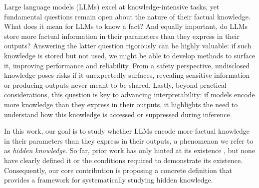 Large language models (LLMs) excel at knowledge-intensive tasks, yet fundamental questions remain open about the nature of their factual knowledge. 
What does it mean for LLMs to know a fact? And equally important, do LLMs store more factual information in their parameters than they express in their outputs? Answering the latter question rigorously can be highly valuable: if such knowledge is stored but not used, we might be able to develop methods to surface it, improving performance and reliability. From a safety perspective, undisclosed knowledge poses risks if it unexpectedly surfaces, revealing sensitive information or producing outputs never meant to be shared. Lastly, beyond practical considerations, this question is key to advancing interpretability: if models encode more knowledge than they express in their outputs, it highlights the need to understand how this knowledge is accessed or suppressed during inference.

In this work, our goal is to study whether LLMs encode more factual knowledge in their parameters than they express in their outputs, a phenomenon we refer to as \textit{hidden knowledge}. So far, prior work has only hinted at its existence \citep{DBLP:conf/iclr/BurnsYKS23,orgad2024llms}, but none have clearly defined it or the conditions required to demonstrate its existence. Consequently, our core contribution is proposing a concrete definition that provides a framework for systematically studying hidden knowledge.

